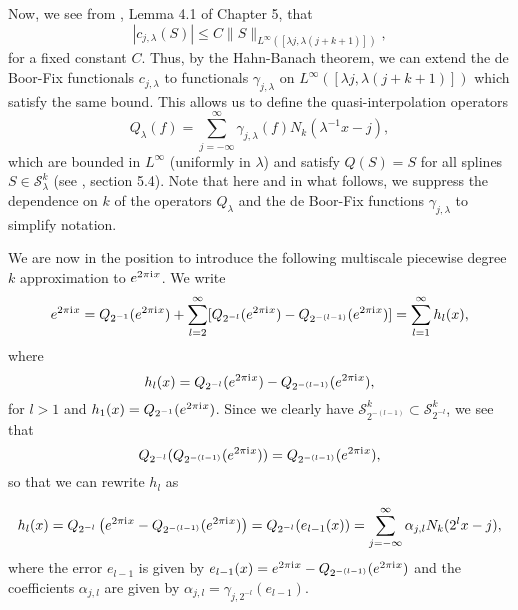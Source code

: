 Now, we see from \cite{devore1993constructive}, Lemma 4.1 of Chapter 5, that
\begin{equation}\label{eq_983}
 |c_{j,\lambda}(S)| \leq C\|S\|_{L^\infty([\lambda j, \lambda (j+k+1)])},
\end{equation}
for a fixed constant $C$. Thus, by the Hahn-Banach theorem, we can extend the de Boor-Fix functionals $c_{j,\lambda}$ to functionals $\gamma_{j,\lambda}$ on $L^\infty([\lambda j, \lambda (j+k+1)])$ which satisfy the same bound. This allows us to define the quasi-interpolation operators
\begin{equation}\label{quasi-interpolation}
 Q_\lambda(f) = \sum_{j=-\infty}^\infty \gamma_{j,\lambda}(f)N_k(\lambda^{-1}x-j),
\end{equation}
which are bounded in $L^\infty$ (uniformly in $\lambda$) and satisfy $Q(S) = S$ for all splines $S\in \mathcal{S}^k_\lambda$ (see \cite{devore1993constructive}, section 5.4). Note that here and in what follows, we suppress the dependence on $k$ of the operators $Q_\lambda$ and the de Boor-Fix functions $\gamma_{j,\lambda}$ to simplify notation.

We are now in the position to introduce the following multiscale piecewise degree $k$ approximation to $e^{2\pi {\mathrm{i}\mkern1mu}   x}$. We write
\begin{equation}\label{multiscale-approx}
 e^{2\pi {\mathrm{i}\mkern1mu}  x} = Q_{2^{-1}}(e^{2\pi {\mathrm{i}\mkern1mu}   x}) + \sum_{l=2}^\infty [Q_{2^{-l}}(e^{2\pi {\mathrm{i}\mkern1mu}   x}) - Q_{2^{-(l-1)}}(e^{2\pi {\mathrm{i}\mkern1mu}   x})] = \sum_{l=1}^\infty h_l(x),
\end{equation}
where
\begin{equation}
 h_l(x) = Q_{2^{-l}}(e^{2\pi {\mathrm{i}\mkern1mu}   x}) - Q_{2^{-(l-1)}}(e^{2\pi {\mathrm{i}\mkern1mu}   x}),
\end{equation}
for $l > 1$ and $h_1(x) = Q_{2^{-1}}(e^{2\pi {\mathrm{i}\mkern1mu}   x})$. Since we clearly have $\mathcal{S}^k_{2^{-(l-1)}} \subset \mathcal{S}^k_{2^{-l}}$, we see that
$$Q_{2^{-l}}(Q_{2^{-(l-1)}}(e^{2\pi {\mathrm{i}\mkern1mu}   x})) = Q_{2^{-(l-1)}}(e^{2\pi {\mathrm{i}\mkern1mu}   x}),$$ 
so that we can rewrite $h_l$ as

\begin{equation}\label{eq_995}
h_l(x) = Q_{2^{-l}}\left(e^{2\pi {\mathrm{i}\mkern1mu}   x} - Q_{2^{-(l-1)}}(e^{2\pi {\mathrm{i}\mkern1mu}   x})\right) = Q_{2^{-l}}(e_{l-1}(x)) = \sum_{j=-\infty}^\infty \alpha_{j,l}N_k(2^{l}x-j),
\end{equation}
where the error $e_{l-1}$ is given by $e_{l-1}(x) = e^{2\pi {\mathrm{i}\mkern1mu}   x} - Q_{2^{-(l-1)}}(e^{2\pi {\mathrm{i}\mkern1mu}   x})$ and the coefficients $\alpha_{j,l}$ are given by $\alpha_{j,l} = \gamma_{j,2^{-l}}(e_{l-1})$.

